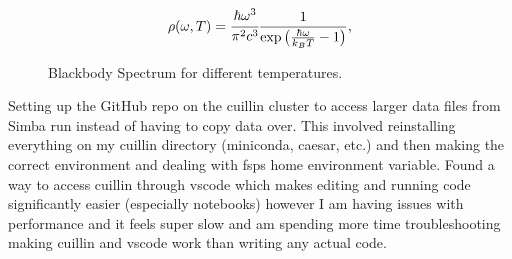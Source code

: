 \documentclass[a4paper, 11pt, oneside]{researchjournal} %
\begin{document}
\begin{equation*}
    \rho(\omega, T)
    =
    \cfrac{\hbar \omega^3}{\pi^2 c^3}
    \frac{1}{\exp\big({\frac{\hbar \omega}{k_BT}} - 1\big)},
\end{equation*}

\begin{figure}[htbp]
    \centering
    \caption{Blackbody Spectrum for different temperatures.}
    \label{fig:PlancksBlackbodySpectrum}
\end{figure}






\newpage

 Setting up the GitHub repo on the cuillin cluster to access larger data files from Simba run instead of having to copy data over. This involved reinstalling everything on my cuillin directory (miniconda, caesar, etc.) and then making the correct environment and dealing with fsps home environment variable. Found a way to access cuillin through vscode which makes editing and running code significantly easier (especially notebooks) however I am having issues with performance and it feels super slow and am spending more time troubleshooting making cuillin and vscode work than writing any actual code. 
\end{document}
